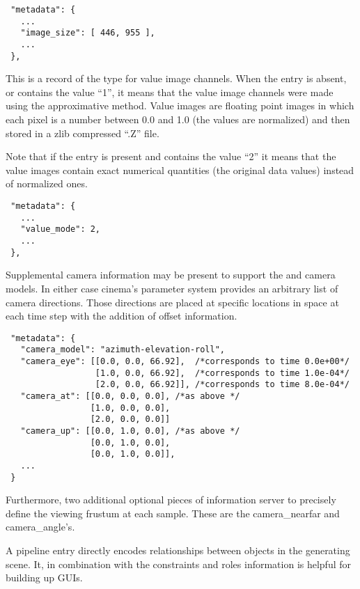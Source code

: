 \begin{verbatim}
 "metadata": {
   ...
   "image_size": [ 446, 955 ],
   ...
 },
\end{verbatim}

\label{sec:valuemode}

This is a record of the type for value image channels. When the entry is absent, or contains the value ``1'', it means that the value image channels were made using the approximative method. Value images are floating point images in which each pixel is a number between 0.0 and 1.0 (the values are normalized) and then stored in a zlib compressed ``.Z'' file.

Note that if the  entry is present and contains the value ``2'' it means that the value images contain exact numerical quantities (the original data values) instead of normalized ones.

\begin{verbatim}
 "metadata": {
   ...
   "value_mode": 2,
   ...
 },
\end{verbatim}

\label{sec:cameradata}

Supplemental camera information may be present to support the \camazimuth and 
\camyaw camera models. In either case cinema's parameter system provides an arbitrary list of camera directions. Those directions are placed at specific locations in space at each time step with the addition of offset information.

\begin{verbatim}
 "metadata": {
   "camera_model": "azimuth-elevation-roll",
   "camera_eye": [[0.0, 0.0, 66.92],  /*corresponds to time 0.0e+00*/
                  [1.0, 0.0, 66.92],  /*corresponds to time 1.0e-04*/
                  [2.0, 0.0, 66.92]], /*corresponds to time 8.0e-04*/
   "camera_at": [[0.0, 0.0, 0.0], /*as above */
                 [1.0, 0.0, 0.0],
                 [2.0, 0.0, 0.0]]
   "camera_up": [[0.0, 1.0, 0.0], /*as above */
                 [0.0, 1.0, 0.0],
                 [0.0, 1.0, 0.0]],
   ...
 }
\end{verbatim}

Furthermore, two additional optional pieces of information server to precisely define the viewing frustum at each sample. These are the camera\_nearfar and camera\_angle's.


A pipeline entry directly encodes relationships between objects in the generating scene. It, in combination with the constraints and roles information is helpful for building up GUIs.

